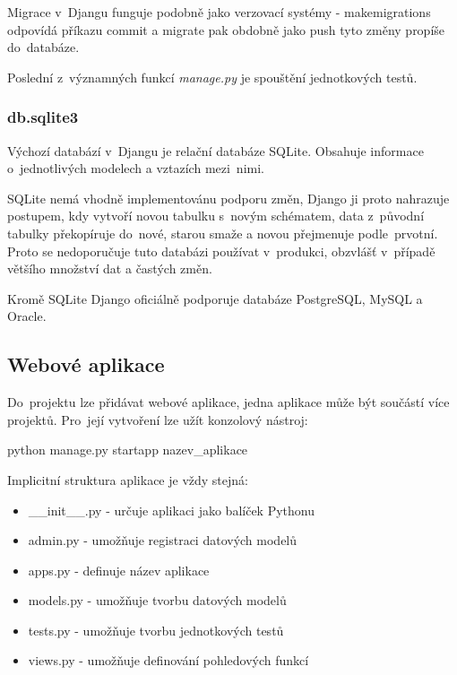 Migrace v~Djangu funguje podobně jako verzovací systémy -
\textsf{makemigrations} odpovídá příkazu \textsf{commit} a
\textsf{migrate} pak obdobně jako \textsf{push} tyto změny propíše do~databáze.

Poslední z~významných funkcí \textit{manage.py} je spouštění
jednotkových testů.

\subsubsection{db.sqlite3}
Výchozí databází v~Djangu je relační databáze SQLite. \cite{django-doc} 
Obsahuje informace o~jednotlivých modelech a vztazích mezi~nimi.

SQLite nemá vhodně implementovánu podporu změn, Django ji proto
nahrazuje postupem, kdy vytvoří novou tabulku s~novým schématem, data
z~původní tabulky překopíruje do~nové, starou smaže a novou přejmenuje
podle~prvotní. Proto se nedoporučuje tuto databázi používat v~produkci, 
obzvlášť v~případě většího množství dat a častých změn.

Kromě SQLite Django oficiálně podporuje databáze PostgreSQL, MySQL a
\linebreak Oracle. \cite{django-doc}

\subsection{Webové aplikace}
\label{django-app}
Do~projektu lze přidávat webové aplikace, jedna aplikace může být
součástí více projektů. Pro~její vytvoření lze užít konzolový nástroj:

\begin{center}
\textsf{python manage.py startapp nazev\_aplikace}
\end{center}

Implicitní struktura aplikace je vždy stejná:

\begin{itemize}
\item \textsf{\_\_init\_\_.py} - určuje aplikaci jako balíček Pythonu
\item \textsf{admin.py} - umožňuje registraci datových modelů
\item \textsf{apps.py} - definuje název aplikace
\item \textsf{models.py} - umožňuje tvorbu datových modelů
\item \textsf{tests.py} - umožňuje tvorbu jednotkových testů
\item \textsf{views.py} - umožňuje definování pohledových funkcí
\end{itemize}

